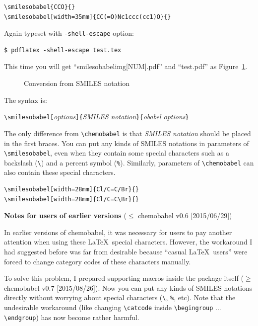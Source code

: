 \documentclass[12pt]{ltjsarticle}
\begin{document}
\begin{verbatim}
\smilesobabel{CCO}{}
\smilesobabel[width=35mm]{CC(=O)Nc1ccc(cc1)O}{}
\end{verbatim}

Again typeset with \verb|-shell-escape| option:
\begin{verbatim}
$ pdflatex -shell-escape test.tex
\end{verbatim}
This time you will get ``smilesobabelimg[NUM].pdf'' and ``test.pdf''
as Figure~\ref{fig:smi1}.
\begin{figure}[h]
  \centering
   \quad
  \caption{Conversion from SMILES notation}\label{fig:smi1}
\end{figure}

The syntax is:
\begin{center}
\verb|\smilesobabel[|\textit{options}\verb|]{|\textit{SMILES notation}\verb|}{|\textit{obabel options}\verb|}|
\end{center}
The only difference from \verb|\chemobabel| is that
\textit{SMILES notation} should be placed in the first braces.
You can put any kinds of SMILES notations in parameters of
\verb|\smilesobabel|, even when they contain some special characters
such as a backslash (\verb|\|) and a percent symbol (\verb|%|).
Similarly, parameters of \verb|\chemobabel| can also contain
these special characters.
\begin{verbatim}
\smilesobabel[width=28mm]{Cl/C=C/Br}{}
\smilesobabel[width=28mm]{Cl/C=C\Br}{}
\end{verbatim}
\begin{figure}[h]
  \centering
   \quad
\end{figure}

\noindent \textbf{Notes for users of earlier versions} ($\le$ \textsf{chemobabel} v0.6 [2015/06/29])

In earlier versions of \textsf{chemobabel}, it was necessary for users
to pay another attention when using these \LaTeX\ special characters.
However, the workaround I had suggested before was far from desirable
because ``casual \LaTeX\ users'' were forced to change category codes
of these characters manually.

To solve this problem, I prepared supporting macros inside the package
itself ($\ge$ \textsf{chemobabel} v0.7 [2015/08/26]).
Now you can put any kinds of SMILES notations directly without worrying
about special characters (\verb|\|, \verb|%|, etc).
Note that the undesirable workaround (like changing \verb|\catcode| inside
\verb|\begingroup| ... \verb|\endgroup|) has now become rather harmful.
\end{document}
